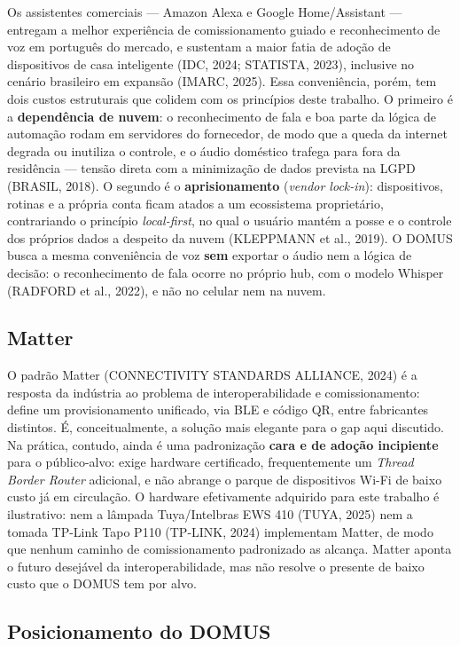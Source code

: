 Os assistentes comerciais --- Amazon Alexa e Google Home/Assistant --- entregam a
melhor experiência de comissionamento guiado e reconhecimento de voz em português
do mercado, e sustentam a maior fatia de adoção de dispositivos de casa inteligente
(IDC, 2024; STATISTA, 2023), inclusive no cenário brasileiro em expansão
(IMARC, 2025). Essa conveniência, porém, tem dois custos estruturais que colidem
com os princípios deste trabalho. O primeiro é a \textbf{dependência de nuvem}: o
reconhecimento de fala e boa parte da lógica de automação rodam em servidores do
fornecedor, de modo que a queda da internet degrada ou inutiliza o controle, e o
áudio doméstico trafega para fora da residência --- tensão direta com a
minimização de dados prevista na LGPD (BRASIL, 2018). O segundo é o
\textbf{aprisionamento} (\textit{vendor lock-in}): dispositivos, rotinas e a
própria conta ficam atados a um ecossistema proprietário, contrariando o princípio
\textit{local-first}, no qual o usuário mantém a posse e o controle dos próprios
dados a despeito da nuvem (KLEPPMANN et al., 2019). O DOMUS busca a mesma
conveniência de voz \textbf{sem} exportar o áudio nem a lógica de decisão: o
reconhecimento de fala ocorre no próprio hub, com o modelo Whisper
(RADFORD et al., 2022), e não no celular nem na nuvem.

\subsection{Matter}\label{sec:matter}

O padrão Matter (CONNECTIVITY STANDARDS ALLIANCE, 2024) é a resposta da indústria
ao problema de interoperabilidade e comissionamento: define um provisionamento
unificado, via BLE e código QR, entre fabricantes distintos. É, conceitualmente, a
solução mais elegante para o gap aqui discutido. Na prática, contudo, ainda é uma
padronização \textbf{cara e de adoção incipiente} para o público-alvo: exige
hardware certificado, frequentemente um \textit{Thread Border Router} adicional, e
não abrange o parque de dispositivos Wi-Fi de baixo custo já em circulação. O
hardware efetivamente adquirido para este trabalho é ilustrativo: nem a lâmpada
Tuya/Intelbras EWS 410 (TUYA, 2025) nem a tomada TP-Link Tapo P110 (TP-LINK, 2024)
implementam Matter, de modo que nenhum caminho de comissionamento padronizado as
alcança. Matter aponta o futuro desejável da interoperabilidade, mas não resolve o
presente de baixo custo que o DOMUS tem por alvo.

\subsection{Posicionamento do DOMUS}\label{sec:posicionamento}

